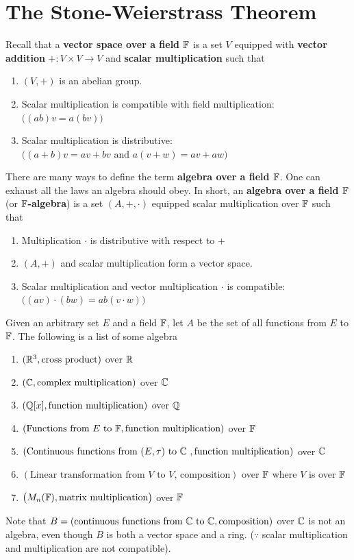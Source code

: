 \documentclass{report}
\begin{document}
\section{The Stone-Weierstrass Theorem}
\begin{mdframed}
Recall that a \textbf{vector space over a field $\mathbb{F}$} is a set $V$ equipped with \textbf{vector addition} $+:V\times V\to V$  and \textbf{scalar multiplication}  such that 
\begin{enumerate}[label=(\alph*)]
  \item $(V,+)$ is an abelian group. 
  \item Scalar multiplication is compatible with field multiplication:   $\Big((ab)v=a(bv) \Big)$
  \item Scalar multiplication is distributive: $\Big((a+b)v=av+bv\text{ and }a(v+w)=av+aw \Big)$
\end{enumerate}

There are many ways to define the term \textbf{algebra over a field $\mathbb{F}$}. One can exhaust all the laws an algebra should obey. In short, an \textbf{algebra over a field $\mathbb{F}$} (or \textbf{$\mathbb{F}$-algebra}) is a set $(A,+,\cdot )$ equipped scalar multiplication over $\mathbb{F}$ such that 
\begin{enumerate}[label=(\alph*)]
  \item Multiplication $\cdot $ is $\underline{\text{distributive}}$ with respect to $+$  
  \item $(A,+)$ and scalar multiplication form a vector space. 
   \item Scalar multiplication and vector multiplication $\cdot $ is compatible: $\Big((av)\cdot (bw)=ab(v\cdot w) \Big)$
\end{enumerate}
Given an arbitrary set $E$ and a field $\mathbb{F}$, let $A$ be the set of all functions from  $E$ to $\mathbb{F}$. The following is a list of some algebra 
\begin{enumerate}[label=(\alph*)]
  \item $(\mathbb{R}^3,\text{cross product})$  over $\mathbb{R}$ 
  \item $(\mathbb{C},\text{complex multiplication})$ over $\mathbb{C}$ 
  \item $(\mathbb{Q}[x],\text{function multiplication})$ over $\mathbb{Q}$
  \item $(\text{Functions from }E\text{ to }\mathbb{F},\text{function multiplication})$ over $\mathbb{F}$
  \item $(\text{Continuous functions from $(E,\tau)$ to $\mathbb{C}$ },\text{function multiplication})$ over $\mathbb{C}$  
  \item $(\text{Linear transformation from $V$ to $V$, composition})$ over $\mathbb{F}$ where  $V$ is over $\mathbb{F}$
  \item $\big(M_n(\mathbb{F}),\text{matrix multiplication}\big)$ over $\mathbb{F}$
\end{enumerate}
Note that $B=(\text{continuous functions from }\mathbb{C}\text{ to }\mathbb{C},\text{composition})$ over $\mathbb{C}$ is not an algebra, even though $B$ is both a vector space and a ring. ($\because$ scalar multiplication and multiplication are not compatible).\\


\end{mdframed}
\end{document}
